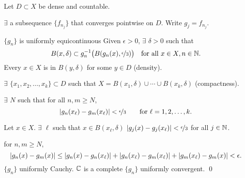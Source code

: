 \documentclass[10pt,aspectratio=169]{beamer}
\begin{document}
\begin{frame}

\begingroup
\color{darkgray}
Let $D \subset X$ be dense and countable.

$\exists$ a subsequence $\{ f_{n_j} \}$ that converges pointwise on
$D$.
Write $g_j = f_{n_j}$.

$\{ g_n \}$ is 
uniformly equicontinuous
\wthus 
Given $\epsilon > 0$, $\exists$ $\delta > 0$
such that
\begin{equation*}
B(x,\delta) \subset g_n^{-1}\bigl(B(g_n(x),\nicefrac{\epsilon}{3})\bigr)
\quad
\text{for all }
x \in X, n \in {\mathbb{N}} .
\end{equation*}
\endgroup
%
\pause
Every $x \in X$ is in $B(y,\delta)$ for some $y \in D$ \quad (density).

\pause
$\exists$ $\{ x_1,x_2,\ldots,x_k \} \subset D$ such that
$X = B(x_1,\delta) \cup \cdots \cup B(x_k,\delta)$
\quad
(compactness).

\pause
$\exists$ $N$ such that for all $n,m \geq N$,
\begin{equation*}
\lvert {g_n(x_\ell)-g_m(x_\ell)} \rvert < \nicefrac{\epsilon}{3}
 \qquad \text{for } \ell=1,2,\ldots,k.
\end{equation*}

\pause
Let $x \in X$.
\quad $\exists$ $\ell$ such that
$x \in B(x_\ell,\delta)$
\pause
\wthus
$\lvert {g_j(x)-g_j(x_\ell)} \rvert < \nicefrac{\epsilon}{3}$
\quad for all $j \in {\mathbb{N}}$.

\pause
\thus \quad
for $n,m \geq N$,
\begin{equation*}
\lvert {g_n(x)-g_m(x)} \rvert \leq
\lvert {g_n(x)-g_n(x_\ell)} \rvert +
\lvert {g_n(x_\ell)-g_m(x_\ell)} \rvert +
\lvert {g_m(x_\ell)-g_m(x)} \rvert <
\epsilon .
\end{equation*}
\pause
\thus \quad
$\{ g_n \}$ uniformly Cauchy.
\quad
\pause
${\mathbb{C}}$ is a complete
\wthus $\{ g_n \}$ uniformly convergent. \qed
\end{frame}
\end{document}
